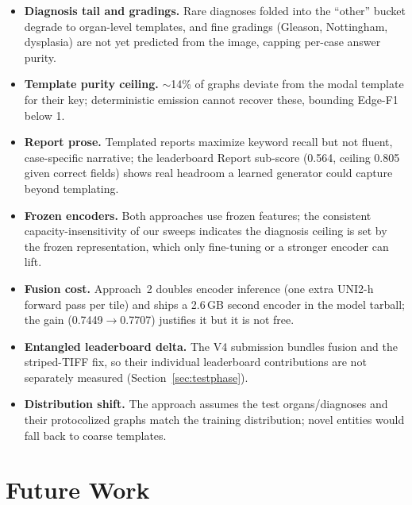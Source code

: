 \documentclass[11pt,a4paper]{article}
\begin{document}
\begin{itemize}[leftmargin=1.4em,itemsep=2pt]
  \item \textbf{Diagnosis tail and gradings.} Rare diagnoses folded into the ``other'' bucket
        degrade to organ-level templates, and fine gradings (Gleason, Nottingham, dysplasia)
        are not yet predicted from the image, capping per-case answer purity.
  \item \textbf{Template purity ceiling.} $\sim$14\% of graphs deviate from the modal template
        for their key; deterministic emission cannot recover these, bounding Edge-F1 below 1.
  \item \textbf{Report prose.} Templated reports maximize keyword recall but not fluent,
        case-specific narrative; the leaderboard Report sub-score (0.564, ceiling 0.805 given
        correct fields) shows real headroom a learned generator could capture beyond templating.
  \item \textbf{Frozen encoders.} Both approaches use frozen features; the consistent
        capacity-insensitivity of our sweeps indicates the diagnosis ceiling is set by the frozen
        representation, which only fine-tuning or a stronger encoder can lift.
  \item \textbf{Fusion cost.} Approach~2 doubles encoder inference (one extra UNI2-h forward pass
        per tile) and ships a 2.6\,GB second encoder in the model tarball; the gain
        (0.7449$\rightarrow$0.7707) justifies it but it is not free.
  \item \textbf{Entangled leaderboard delta.} The V4 submission bundles fusion and the striped-TIFF
        fix, so their individual leaderboard contributions are not separately measured
        (Section~\ref{sec:testphase}).
  \item \textbf{Distribution shift.} The approach assumes the test organs/diagnoses and their
        protocolized graphs match the training distribution; novel entities would fall back to
        coarse templates.
\end{itemize}

\section{Future Work}
\label{sec:future}
\end{document}
